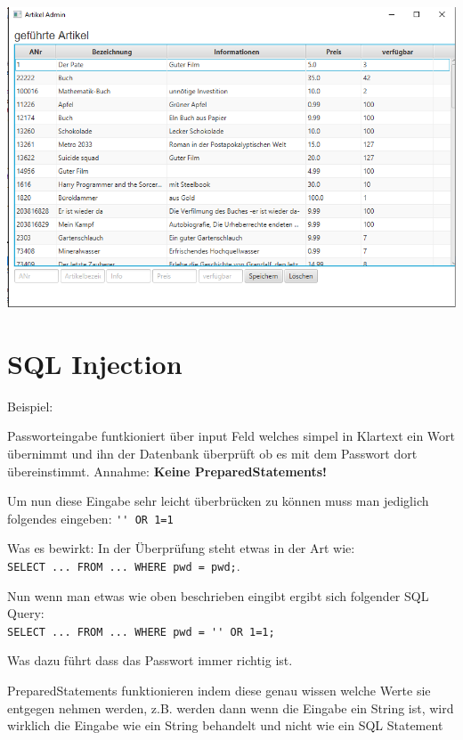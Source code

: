 \begin{minipage}{\linewidth}
	\centering
	\includegraphics[width=0.8\linewidth]{images/gui}
\end{minipage}


\section{SQL Injection}
Beispiel:

Passworteingabe funtkioniert über input Feld welches simpel in Klartext ein Wort übernimmt und ihn der Datenbank überprüft ob es mit dem Passwort dort übereinstimmt. Annahme: \textbf{Keine PreparedStatements!}

Um nun diese Eingabe sehr leicht überbrücken zu können muss man jediglich folgendes eingeben: \verb|'' OR 1=1|

Was es bewirkt:
In der Überprüfung steht etwas in der Art wie:\\
\verb|SELECT ... FROM ... WHERE pwd = pwd;|.

Nun wenn man etwas wie oben beschrieben eingibt ergibt sich folgender SQL Query:
\\
\verb|SELECT ... FROM ... WHERE pwd = '' OR 1=1;|

Was dazu führt dass das Passwort immer richtig ist.


PreparedStatements funktionieren indem diese genau wissen welche Werte sie entgegen nehmen werden, z.B. werden dann wenn die Eingabe ein String ist, wird wirklich die Eingabe wie ein String behandelt und nicht wie ein SQL Statement
